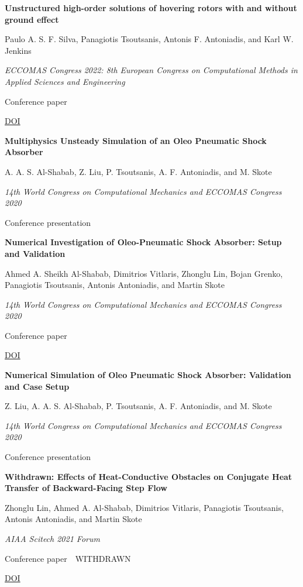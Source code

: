 \documentclass[11pt,a4paper]{article}
\newlength{\cventrysep}
\newenvironment{cventry}{%
  \par\noindent\begin{minipage}{\linewidth}
  \RaggedRight\fontsize{9.8}{12.5}\selectfont
}{\end{minipage}\par\addvspace{\cventrysep}}
\newcommand{\cvtitle}[1]{{\bfseries #1\par}\vspace{1pt}}
\newcommand{\cvdetail}[1]{{#1\par}\vspace{1pt}}
\newcommand{\cvmeta}[1]{{\fontsize{9}{11.5}\selectfont\color{Muted}#1\par}\vspace{1pt}}
\newcommand{\cvlinks}[1]{{\fontsize{9}{11.5}\selectfont #1\par}}
\newcommand{\cvyear}[1]{{\color{Teal}\bfseries\fontsize{11}{13}\selectfont #1\par}\vspace{6pt}}
\begin{document}
\begin{cventry}
\cvtitle{Unstructured high-order solutions of hovering rotors with and without ground effect}
\cvdetail{Paulo A. S. F. Silva, Panagiotis Tsoutsanis, Antonis F. Antoniadis, and Karl W. Jenkins}
\cvmeta{\textit{ECCOMAS Congress 2022: 8th European Congress on Computational Methods in Applied Sciences and Engineering}\par Conference paper}
\cvlinks{\href{https://doi.org/10.23967/eccomas.2022.283}{DOI}}
\end{cventry}

\begin{cventry}
\cvyear{2021}
\cvtitle{Multiphysics Unsteady Simulation of an Oleo Pneumatic Shock Absorber}
\cvdetail{A. A. S. Al-Shabab, Z. Liu, P. Tsoutsanis, A. F. Antoniadis, and M. Skote}
\cvmeta{\textit{14th World Congress on Computational Mechanics and ECCOMAS Congress 2020}\par Conference presentation}
\end{cventry}

\begin{cventry}
\cvtitle{Numerical Investigation of Oleo-Pneumatic Shock Absorber: Setup and Validation}
\cvdetail{Ahmed A. Sheikh Al-Shabab, Dimitrios Vitlaris, Zhonglu Lin, Bojan Grenko, Panagiotis Tsoutsanis, Antonis Antoniadis, and Martin Skote}
\cvmeta{\textit{14th World Congress on Computational Mechanics and ECCOMAS Congress 2020}\par Conference paper}
\cvlinks{\href{https://doi.org/10.23967/wccm-eccomas.2020.231}{DOI}}
\end{cventry}

\begin{cventry}
\cvtitle{Numerical Simulation of Oleo Pneumatic Shock Absorber: Validation and Case Setup}
\cvdetail{Z. Liu, A. A. S. Al-Shabab, P. Tsoutsanis, A. F. Antoniadis, and M. Skote}
\cvmeta{\textit{14th World Congress on Computational Mechanics and ECCOMAS Congress 2020}\par Conference presentation}
\end{cventry}

\begin{cventry}
\cvtitle{Withdrawn: Effects of Heat-Conductive Obstacles on Conjugate Heat Transfer of Backward-Facing Step Flow}
\cvdetail{Zhonglu Lin, Ahmed A. Al-Shabab, Dimitrios Vitlaris, Panagiotis Tsoutsanis, Antonis Antoniadis, and Martin Skote}
\cvmeta{\textit{AIAA Scitech 2021 Forum}\par Conference paper \,\textperiodcentered{}\, WITHDRAWN}
\cvlinks{\href{https://doi.org/10.2514/6.2021-2007}{DOI}}
\end{cventry}
\end{document}
